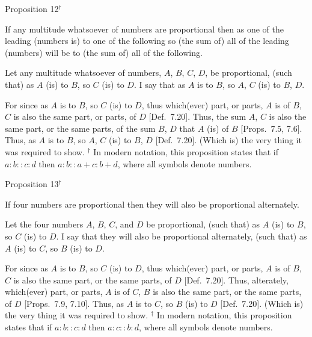 
\begin{center}
{\large Proposition 12}$^\dag$
\end{center}

If any multitude whatsoever of numbers are proportional then as one of the leading (numbers is) to one of the
following so (the sum of) all of the leading (numbers) will be to 
(the sum of) all of the following.

\epsfysize=2in
\centerline{}

Let any multitude  whatsoever of numbers, $A$, $B$, $C$,  $D$, be proportional,
(such that) as $A$ (is) to $B$, so $C$ (is) to $D$. I say that as $A$ is to $B$, so
$A$, $C$ (is) to $B$, $D$.

For since as $A$ is to $B$, so $C$ (is) to $D$, thus which(ever) part, or parts,
$A$ is of $B$, $C$ is also the same part, or parts, of $D$ [Def.~7.20]. Thus, the sum $A$, $C$ is also
the same part, or the same parts, of the sum $B$, $D$ that $A$ (is) of $B$  [Props.~7.5, 7.6]. Thus, as $A$ is to $B$, so $A$, $C$ (is) to
$B$, $D$ [Def.~7.20]. (Which is) the very thing it
was required to show.
{\footnotesize\noindent$^\dag$ In modern notation, this
proposition states that if $a:b::c:d$ then $a:b::a+c:b+d$, where all
symbols denote numbers.}


\begin{center}
{\large Proposition 13}$^\dag$
\end{center}

If four numbers are proportional then they will
also be proportional alternately.

\epsfysize=2in
\centerline{}

Let the four numbers $A$, $B$, $C$, and $D$ be proportional, (such that) as
$A$ (is) to $B$, so $C$ (is) to $D$. I say that they will also be proportional
alternately, (such that) as $A$ (is) to $C$, so $B$ (is) to $D$.

For since as $A$ is to $B$, so $C$ (is) to $D$, thus which(ever) part, or parts,
$A$ is of $B$, $C$ is also the same part, or the same parts, of $D$  [Def.~7.20]. Thus, alterately, which(ever)
part, or parts, $A$ is of $C$, $B$ is also the same part, or the same parts, of $D$
[Props.~7.9, 7.10]. Thus, as $A$ is to $C$, so $B$ (is) to $D$
[Def.~7.20]. (Which is) the very thing it
was required to show.
{\footnotesize\noindent$^\dag$ In modern notation, this
proposition states that if $a:b::c:d$ then $a:c::b:d$, where all
symbols denote numbers.}

